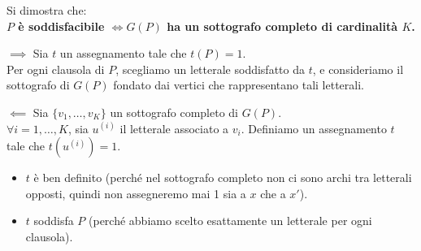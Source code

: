 \begin{center}
\end{center}

Si dimostra che: \\
\textbf{$P$ è soddisfacibile $\iff G(P)$ ha un sottografo completo di cardinalità $K$.}

$\implies$ Sia $t$ un assegnamento tale che $t(P) = 1$. \\
Per ogni clausola di $P$, scegliamo un letterale soddisfatto da $t$, e consideriamo il sottografo di $G(P)$ fondato dai vertici che rappresentano tali letterali.

$\impliedby$ Sia $\{v_1, \dots, v_K\}$ un sottografo completo di $G(P)$. \\
$\forall i = 1, \dots, K$, sia $u^{(i)}$ il letterale associato a $v_i$. Definiamo un assegnamento $t$ tale che $t(u^{(i)}) = 1$.
\begin{itemize}
    \item $t$ è ben definito (perché nel sottografo completo non ci sono archi tra letterali opposti, quindi non assegneremo mai 1 sia a $x$ che a $x'$).
    \item $t$ soddisfa $P$ (perché abbiamo scelto esattamente un letterale per ogni clausola).
\end{itemize}


